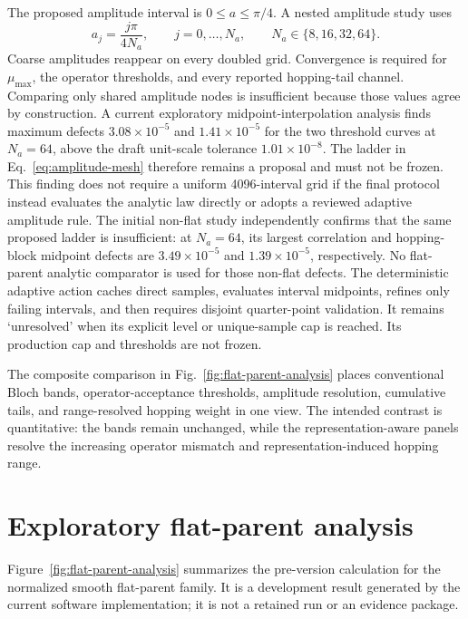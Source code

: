 \documentclass[11pt]{article}
\begin{document}
The proposed amplitude interval is $0\le a\le\pi/4$. A nested amplitude study uses
\begin{equation}
 a_j=\frac{j\pi}{4N_a},
 \qquad j=0,\ldots,N_a,
 \qquad N_a\in\{8,16,32,64\}.
 \label{eq:amplitude-mesh}
\end{equation}
Coarse amplitudes reappear on every doubled grid. Convergence is required for
$\mu_{\max}$, the operator thresholds, and every reported hopping-tail channel.
Comparing only shared amplitude nodes is insufficient because those values agree by
construction. A current exploratory midpoint-interpolation analysis finds maximum
defects $3.08\times10^{-5}$ and $1.41\times10^{-5}$ for the two threshold curves at
$N_a=64$, above the draft unit-scale tolerance $1.01\times10^{-8}$. The ladder in
Eq.~\eqref{eq:amplitude-mesh} therefore remains a proposal and must not be frozen. This
finding does not require a uniform 4096-interval grid if the final protocol instead
evaluates the analytic law directly or adopts a reviewed adaptive amplitude rule. The
initial non-flat study independently confirms that the same proposed ladder is
insufficient: at $N_a=64$, its largest correlation and hopping-block midpoint defects
are $3.49\times10^{-5}$ and $1.39\times10^{-5}$, respectively. No flat-parent analytic
comparator is used for those non-flat defects. The deterministic adaptive action caches
direct samples, evaluates interval midpoints, refines only failing intervals, and then
requires disjoint quarter-point validation. It remains `unresolved' when its explicit
level or unique-sample cap is reached. Its production cap and thresholds are not frozen.

The composite comparison in Fig.~\ref{fig:flat-parent-analysis} places conventional
Bloch bands, operator-acceptance thresholds, amplitude resolution, cumulative tails, and
range-resolved hopping weight in one view. The intended contrast is quantitative: the
bands remain unchanged, while the representation-aware panels resolve the increasing
operator mismatch and representation-induced hopping range.

\section{Exploratory flat-parent analysis}
\label{sec:exploratory-analysis}

Figure~\ref{fig:flat-parent-analysis} summarizes the pre-version calculation for the
normalized smooth flat-parent family. It is a development result generated by the
current software implementation; it is not a retained run or an evidence package.
\end{document}
